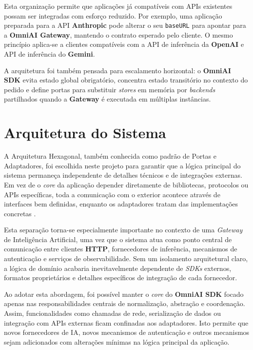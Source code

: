     Esta organização permite que aplicações já compatíveis com APIs existentes possam ser integradas com esforço reduzido. Por exemplo, uma aplicação preparada para a API \textbf{Anthropic} pode alterar o seu \texttt{baseURL} para apontar para a \textbf{OmniAI Gateway}, mantendo o contrato esperado pelo cliente. O mesmo princípio aplica-se a clientes compatíveis com a API de inferência da \textbf{OpenAI} e API de inferência do \textbf{Gemini}. 
    
    A arquitetura foi também pensada para escalamento horizontal: o \textbf{OmniAI SDK} evita estado global obrigatório, concentra estado transitório no contexto do pedido e define portas para substituir \textit{stores} em memória por \textit{backends} partilhados quando a \textbf{Gateway} é executada em múltiplas instâncias.

\section{Arquitetura do Sistema}

A Arquitetura Hexagonal, também conhecida como padrão de Portas e Adaptadores, foi escolhida neste projeto para garantir que a lógica principal do sistema permaneça independente de detalhes técnicos e de integrações externas. Em vez de o \textit{core} da aplicação depender diretamente de bibliotecas, protocolos ou APIs específicas, toda a comunicação com o exterior acontece através de interfaces bem definidas, enquanto os adaptadores tratam das implementações concretas \cite{gfg_hexagonal_architecture, hexagonal_ports, netflix_hexagonal}.

Esta separação torna-se especialmente importante no contexto de uma \textit{Gateway} de Inteligência Artificial, uma vez que o sistema atua como ponto central de comunicação entre clientes \textbf{HTTP}, fornecedores de inferência, mecanismos de autenticação e serviços de observabilidade. Sem um isolamento arquitetural claro, a lógica de domínio acabaria inevitavelmente dependente de \textit{SDKs} externos, formatos proprietários e detalhes específicos de integração de cada fornecedor.

Ao adotar esta abordagem, foi possível manter o \textit{core} do \textbf{OmniAI SDK} focado apenas nas responsabilidades centrais de normalização, abstração e coordenação. Assim, funcionalidades como chamadas de rede, serialização de dados ou integração com APIs externas ficam confinadas aos adaptadores. Isto permite que novos fornecedores de IA, novos mecanismos de autenticação e outros mecanismos sejam adicionados com alterações mínimas na lógica principal da aplicação.


